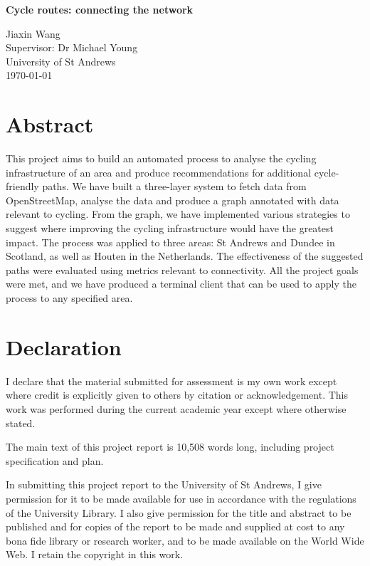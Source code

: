 \documentclass[12pt,a4paper]{report}
\begin{document}
\pagestyle{empty}

\vspace*{60mm}
\begin{center}
\Huge
\textbf{Cycle routes: connecting the network}

\vfill
\large
Jiaxin Wang \\[3mm]
Supervisor: Dr Michael Young \\[3mm]
University of St Andrews \\[3mm]
\today  %
\end{center}
\thispagestyle{empty}

\pagestyle{plain}
\chapter*{Abstract}
This project aims to build an automated process to analyse the cycling infrastructure of an area and produce recommendations for additional cycle-friendly paths. We have built a three-layer system to fetch data from OpenStreetMap, analyse the data and produce a graph annotated with data relevant to cycling. From the graph, we have implemented various strategies to suggest where improving the cycling infrastructure would have the greatest impact. The process was applied to three areas: St Andrews and Dundee in Scotland, as well as Houten in the Netherlands. The effectiveness of the suggested paths were evaluated using metrics relevant to connectivity. All the project goals were met, and we have produced a terminal client that can be used to apply the process to any specified area.

\chapter*{Declaration}
I declare that the material submitted for assessment is my own work except where credit is explicitly given to others by citation or acknowledgement. This work was performed during the current academic year except where otherwise stated.

The main text of this project report is 10,508 words long, including project specification and plan.

In submitting this project report to the University of St Andrews, I give permission for it to be made available for use in accordance with the regulations of the University Library. I also give permission for the title and abstract to be published and for copies of the report to be made and supplied at cost to any bona fide library or research worker, and to be made available on the World Wide Web. I retain the copyright in this work.
\end{document}
